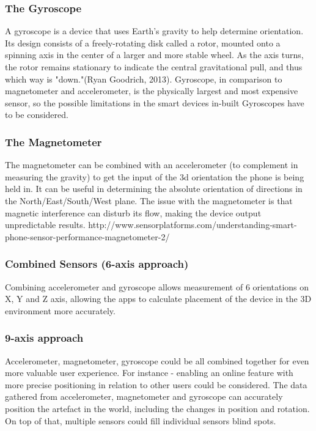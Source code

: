 \subsubsection*{The Gyroscope}
A gyroscope is a device that uses Earth's gravity to help determine orientation. Its design consists of a freely-rotating disk called a rotor, mounted onto a spinning axis in the center of a larger and more stable wheel. As the axis turns, the rotor remains stationary to indicate the central gravitational pull, and thus which way is "down."(Ryan Goodrich, 2013). Gyroscope, in comparison to magnetometer and accelerometer, is the physically largest and most expensive sensor, so the possible limitations in the smart devices in-built Gyroscopes have to be considered. 
\subsubsection*{The Magnetometer}
The magnetometer can be combined with an accelerometer (to complement in measuring the gravity) to get the input of the 3d orientation the phone is being held in. It can be useful in determining the absolute orientation of directions in the North/East/South/West plane. The issue with the magnetometer is that magnetic interference can disturb its flow, making the device output unpredictable results.
http://www.sensorplatforms.com/understanding-smart-phone-sensor-performance-magnetometer-2/
\subsubsection*{Combined Sensors (6-axis approach)}
Combining accelerometer and gyroscope allows measurement of 6 orientations on X, Y and Z axis, allowing the apps to calculate placement of the device in the 3D environment more accurately.
\subsubsection*{9-axis approach}
Accelerometer, magnetometer, gyroscope could be all combined together for even more valuable user experience. For instance - enabling an online feature with more precise positioning in relation to other users could be considered. The data gathered from accelerometer, magnetometer and gyroscope can accurately position the artefact in the world, including the changes in position and rotation. On top of that, multiple sensors could fill individual sensors blind spots. 
